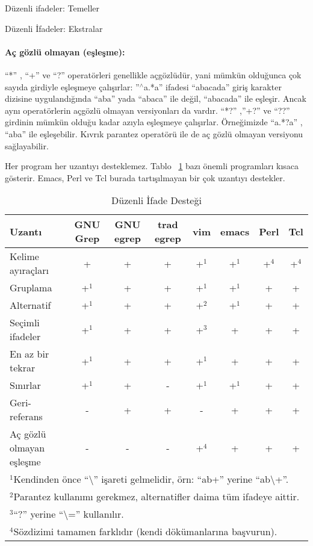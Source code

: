 \begin{section}{Düzenli ifadeler: Temeller}
\begin{subsection}{Düzenli İfadeler: Ekstralar}
\paragraph{Aç gözlü olmayan (eşleşme):}{“*” , “+” ve “?” operatörleri genellikle açgözlüdür, yani mümkün olduğunca çok sayıda girdiyle eşleşmeye çalışırlar: ”$ ^\wedge $a.*a” ifadesi “abacada” giriş karakter dizisine uygulandığında “aba” yada “abaca” ile değil, “abacada” ile eşleşir. Ancak aynı operatörlerin açgözlü olmayan versiyonları da vardır. “*?” ,”+?” ve “??” girdinin mümkün olduğu kadar azıyla eşleşmeye çalışırlar. Örneğimizde “a.*?a” , “aba” ile eşleşebilir. Kıvrık parantez operatörü ile de aç gözlü olmayan versiyonu sağlayabilir.}
 
Her program her uzantıyı desteklemez. Tablo ~\ref{tab:7.1} bazı önemli programları kısaca gösterir. Emacs, Perl ve Tcl burada tartışılmayan bir çok uzantıyı destekler.

\begin {table}[htb]\footnotesize
\caption {Düzenli İfade Desteği} \label{tab:7.1}
\begin{tabular}{l*{7}{c}}
\hline
Uzantı & GNU Grep & GNU egrep & trad egrep & vim & emacs & Perl & Tcl \\
\hline
Kelime ayıraçları & + & + & + & +$^1$ & +$^1$ & +$^4$ & +$^4$ \\
Gruplama & +$^1$ & + & + & +$^1$ & +$^1$ & + & + \\
Alternatif & +$^1$ & + & + & +$^2$ & +$^1$ & + & + \\
Seçimli ifadeler & +$^1$ & + & + & +$^3$ & + & + & + \\
En az bir tekrar & +$^1$ & + & + & +$^1$ & + & + & + \\
Sınırlar & +$^1$ & + & - & +$^1$ & +$^1$ & + & + \\
Geri-referans & - & + & + & - & + & + & + \\
Aç gözlü olmayan eşleşme & - & - & - & +$^4$ & + & + & + \\
\hline
\multicolumn{8}{l}{$^1$Kendinden önce “\textbackslash” işareti gelmelidir, örn: “ab+” yerine “ab\textbackslash+”.} \\
\multicolumn{8}{l}{$^2$Parantez kullanımı gerekmez, alternatifler daima tüm ifadeye aittir.} \\
\multicolumn{8}{l}{$^3$“?” yerine “\textbackslash=” kullanılır.} \\
\multicolumn{8}{l}{$^4$Sözdizimi tamamen farklıdır (kendi dökümanlarına başvurun).} \\
\end{tabular}
\end {table}

\end{subsection}
\end{section}
